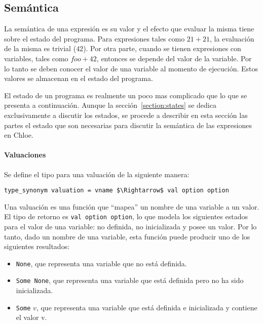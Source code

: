 \subsection{Semántica}\label{subsection:semantics_expressions}

La semántica de una expresión es su valor y el efecto que evaluar la misma tiene sobre el estado del programa.
Para expresiones tales como $21 + 21$, la evaluación de la misma es trivial ($42$).
Por otra parte, cuando se tienen expresiones con variables, tales como $foo + 42$, entonces se depende del valor de la variable.
Por lo tanto se deben conocer el valor de una variable al momento de ejecución.
Estos valores se almacenan en el estado del programa.

El estado de un programa es realmente un poco mas complicado que lo que se presenta a continuación.
Aunque la sección~\ref{section:states} se dedica exclusivamente a discutir los estados, se procede a describir en esta sección las partes el estado que son necesarias para discutir la semántica de las expresiones en Chloe.

\paragraph*{Valuaciones}\label{paragraph:valuation}

Se define el tipo para una valuación de la siguiente manera:

\begin{lstlisting}[frame=single, mathescape=true]
type_synonym valuation = vname $\Rightarrow$ val option option
\end{lstlisting}

Una valuación es una función que ``mapea'' un nombre de una variable a un valor.
El tipo de retorno es \verb|val option option|, lo que modela los siguientes estados para el valor de una variable: no definida, no inicializada y posee un valor.
Por lo tanto, dado un nombre de una variable, esta función puede producir uno de los siguientes resultados:

\begin{itemize}
  \item{\verb|None|, que representa una variable que no está definida.}
  \item{\verb|Some None|, que representa una variable que está definida pero no ha sido inicializada.}
  \item{\verb|Some| $v$, que representa una variable que está definida e inicializada y contiene el valor v.}
\end{itemize}

